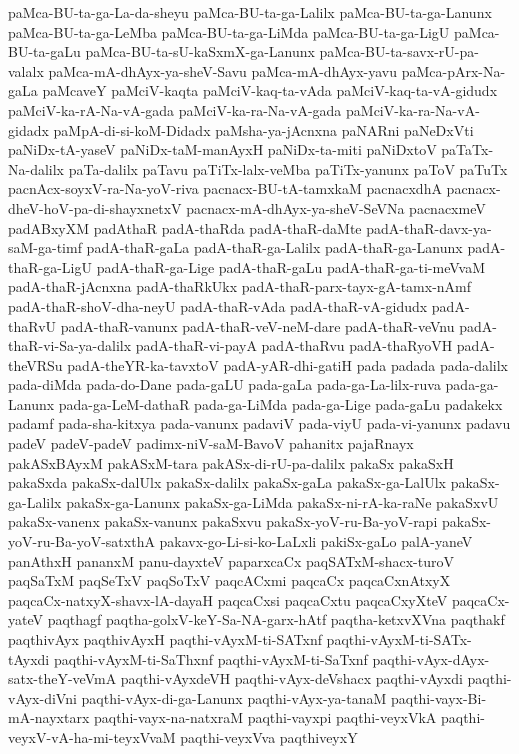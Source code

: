 {paMca-BU-ta-ga-La-da-sheyu
paMca-BU-ta-ga-Lalilx
paMca-BU-ta-ga-Lanunx
paMca-BU-ta-ga-LeMba
paMca-BU-ta-ga-LiMda
paMca-BU-ta-ga-LigU
paMca-BU-ta-gaLu
paMca-BU-ta-sU-kaSxmX-ga-Lanunx
paMca-BU-ta-savx-rU-pa-valalx
paMca-mA-dhAyx-ya-sheV-Savu
paMca-mA-dhAyx-yavu
paMca-pArx-Na-gaLa
paMcaveY
paMciV-kaqta
paMciV-kaq-ta-vAda
paMciV-kaq-ta-vA-gidudx
paMciV-ka-rA-Na-vA-gada
paMciV-ka-ra-Na-vA-gada
paMciV-ka-ra-Na-vA-gidadx
paMpA-di-si-koM-Didadx
paMsha-ya-jAcnxna
paNARni
paNeDxVti
paNiDx-tA-yaseV
paNiDx-taM-manAyxH
paNiDx-ta-miti
paNiDxtoV
paTaTx-Na-dalilx
paTa-dalilx
paTavu
paTiTx-lalx-veMba
paTiTx-yanunx
paToV
paTuTx
pacnAcx-soyxV-ra-Na-yoV-riva
pacnacx-BU-tA-tamxkaM
pacnacxdhA
pacnacx-dheV-hoV-pa-di-shayxnetxV
pacnacx-mA-dhAyx-ya-sheV-SeVNa
pacnacxmeV
padABxyXM
padAthaR
padA-thaRda
padA-thaR-daMte
padA-thaR-davx-ya-saM-ga-timf
padA-thaR-gaLa
padA-thaR-ga-Lalilx
padA-thaR-ga-Lanunx
padA-thaR-ga-LigU
padA-thaR-ga-Lige
padA-thaR-gaLu
padA-thaR-ga-ti-meVvaM
padA-thaR-jAcnxna
padA-thaRkUkx
padA-thaR-parx-tayx-gA-tamx-nAmf
padA-thaR-shoV-dha-neyU
padA-thaR-vAda
padA-thaR-vA-gidudx
padA-thaRvU
padA-thaR-vanunx
padA-thaR-veV-neM-dare
padA-thaR-veVnu
padA-thaR-vi-Sa-ya-dalilx
padA-thaR-vi-payA
padA-thaRvu
padA-thaRyoVH
padA-theVRSu
padA-theYR-ka-tavxtoV
padA-yAR-dhi-gatiH
pada
padada
pada-dalilx
pada-diMda
pada-do-Dane
pada-gaLU
pada-gaLa
pada-ga-La-lilx-ruva
pada-ga-Lanunx
pada-ga-LeM-dathaR
pada-ga-LiMda
pada-ga-Lige
pada-gaLu
padakekx
padamf
pada-sha-kitxya
pada-vanunx
padaviV
pada-viyU
pada-vi-yanunx
padavu
padeV
padeV-padeV
padimx-niV-saM-BavoV
pahanitx
pajaRnayx
pakASxBAyxM
pakASxM-tara
pakASx-di-rU-pa-dalilx
pakaSx
pakaSxH
pakaSxda
pakaSx-dalUlx
pakaSx-dalilx
pakaSx-gaLa
pakaSx-ga-LalUlx
pakaSx-ga-Lalilx
pakaSx-ga-Lanunx
pakaSx-ga-LiMda
pakaSx-ni-rA-ka-raNe
pakaSxvU
pakaSx-vanenx
pakaSx-vanunx
pakaSxvu
pakaSx-yoV-ru-Ba-yoV-rapi
pakaSx-yoV-ru-Ba-yoV-satxthA
pakavx-go-Li-si-ko-LaLxli
pakiSx-gaLo
palA-yaneV
panAthxH
pananxM
panu-dayxteV
paparxcaCx
paqSATxM-shacx-turoV
paqSaTxM
paqSeTxV
paqSoTxV
paqcACxmi
paqcaCx
paqcaCxnAtxyX
paqcaCx-natxyX-shavx-lA-dayaH
paqcaCxsi
paqcaCxtu
paqcaCxyXteV
paqcaCx-yateV
paqthagf
paqtha-golxV-keY-Sa-NA-garx-hAtf
paqtha-ketxvXVna
paqthakf
paqthivAyx
paqthivAyxH
paqthi-vAyxM-ti-SATxnf
paqthi-vAyxM-ti-SATx-tAyxdi
paqthi-vAyxM-ti-SaThxnf
paqthi-vAyxM-ti-SaTxnf
paqthi-vAyx-dAyx-satx-theY-veVmA
paqthi-vAyxdeVH
paqthi-vAyx-deVshacx
paqthi-vAyxdi
paqthi-vAyx-diVni
paqthi-vAyx-di-ga-Lanunx
paqthi-vAyx-ya-tanaM
paqthi-vayx-Bi-mA-nayxtarx
paqthi-vayx-na-natxraM
paqthi-vayxpi
paqthi-veyxVkA
paqthi-veyxV-vA-ha-mi-teyxVvaM
paqthi-veyxVva
paqthiveyxY
}
